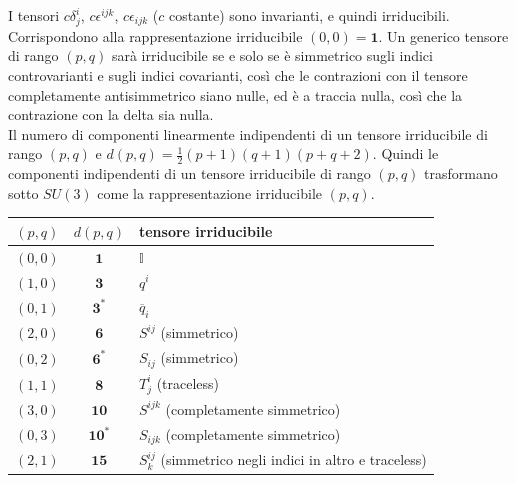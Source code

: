 \documentclass[12pt,a4paper]{article}
\theoremstyle{definition}
\numberwithin{equation}{section}
\begin{document}
I tensori $c\delta^i_j$, $c\epsilon^{ijk}$, $c\epsilon_{ijk}$ ($c$ costante) sono invarianti, e quindi irriducibili. Corrispondono alla rappresentazione irriducibile $(0,0)=\mathbf{1}$. Un generico tensore di rango $(p,q)$ sarà irriducibile se e solo se è simmetrico sugli indici controvarianti e sugli indici covarianti, così che le contrazioni con il tensore completamente antisimmetrico siano nulle, ed è a traccia nulla, così che la contrazione con la delta sia nulla. \\
Il numero di componenti linearmente indipendenti di un tensore irriducibile di rango $(p,q)$ e $d(p,q)=\frac{1}{2}(p+1)(q+1)(p+q+2)$. Quindi le componenti indipendenti di un tensore irriducibile di rango $(p,q)$ trasformano sotto $SU(3)$ come la rappresentazione irriducibile $(p,q)$.
\begin{table}[h]
\centering
\begin{tabular}{c|c|l}
\toprule
$(p,q)$ & $d(p,q)$ & tensore irriducibile \\
\midrule
$(0,0)$ & $\mathbf{1}$ & $\mathbb{I}$ \\
$(1,0)$ & $\mathbf{3}$ & $q^i$ \\
$(0,1)$ & $\mathbf{3}^*$ & $\overline{q}_i$ \\
$(2,0)$ & $\mathbf{6}$ & $S^{ij}$ (simmetrico) \\
$(0,2)$ & $\mathbf{6}^*$ & $S_{ij}$ (simmetrico) \\
$(1,1)$ & $\mathbf{8}$ &  $T^i_j$ (traceless) \\
$(3,0)$ & $\mathbf{10}$ & $S^{ijk}$ (completamente simmetrico) \\
$(0,3)$ & $\mathbf{10}^*$ & $S_{ijk}$ (completamente simmetrico) \\
$(2,1)$ & $\mathbf{15}$ & $S^{ij}_k$ (simmetrico negli indici in altro e traceless) \\
\bottomrule
\end{tabular}
\end{table}
\end{document}
